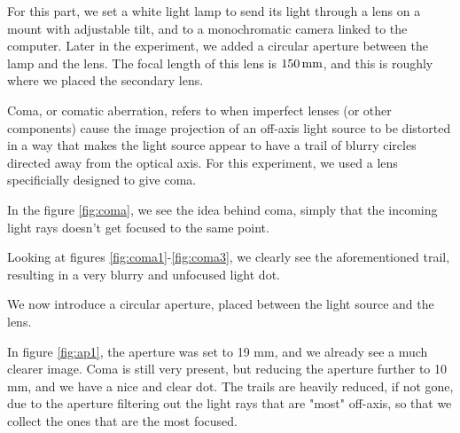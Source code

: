 
For this part, we set a white light lamp to send its light through
a lens on a mount with adjustable tilt, and to a monochromatic camera
linked to the computer. Later in the experiment, we added a circular
aperture between the lamp and the lens. The focal length of this lens is
$150 \, \textrm{mm}$, and this is roughly where we placed the secondary lens.

Coma, or comatic aberration, refers to when imperfect lenses 
(or other components) cause the image projection of an off-axis 
light source to be distorted in a way that makes the light source
appear to have a trail of blurry circles directed away from the 
optical axis. For this experiment, we used a lens specificially 
designed to give coma. 

In the figure \vref{fig:coma}, we see the idea behind coma, 
simply that the incoming light rays doesn't get focused to the same point.



Looking at figures \vref{fig:coma1}-\vref{fig:coma3}, we clearly see
the aforementioned trail, resulting in a very blurry and unfocused light dot.

We now introduce a circular aperture, placed between the light source and the
lens.

In figure \vref{fig:ap1}, the aperture was set to 19 mm, and we already see
a much clearer image. Coma is still very present, but reducing the aperture
further to 10 mm, and we have a nice and clear dot. The trails are heavily 
reduced, if not gone, due to the aperture filtering out the light rays that 
are "most" off-axis, so that we collect the ones that are the most focused.

